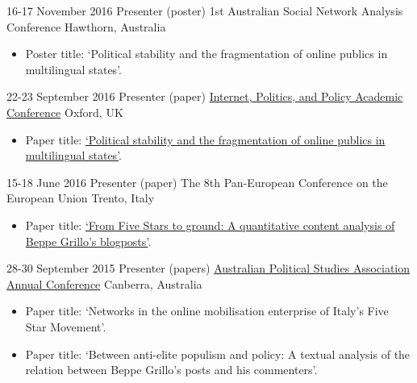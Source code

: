 \documentclass[11pt,a4paper,sans]{moderncv}
\begin{document}
    \cventry
      {16-17 November 2016} %
    {Presenter (poster)} %
    {1st Australian Social Network Analysis Conference} %
    {Hawthorn, Australia} %
  {}
    {
      \begin{itemize} %
        \item {Poster title: `Political stability and the fragmentation of online publics in multilingual states'.}
      \end{itemize}
    }

    \cventry
        {22-23 September 2016} %
    {Presenter (paper)} %
    {\href{http://ipp.oii.ox.ac.uk/2016}{Internet, Politics, and Policy Academic Conference}} %
    {Oxford, UK} %
{}
    {
      \begin{itemize} %
        \item {Paper title: \href{http://ipp.oii.ox.ac.uk/2016/programme-2016/track-a-politics/participation-ii-networks-and/francesco-bailo-political-stability-and}{`Political stability and the fragmentation of online publics in multilingual states'}.}
      \end{itemize}
    }


    \cventry
        {15-18 June 2016} %
    {Presenter (paper)} %
    {The 8th Pan-European Conference on the European Union} %
    {Trento, Italy} %
{}
    {
      \begin{itemize} %
        \item {Paper title:  \href{http://ecpr.eu/Events/PaperDetails.aspx?PaperID=27234&amp;EventID=105}{`From Five Stars to ground: A quantitative content analysis of Beppe Grillo's blogposts'}.}
      \end{itemize}
    }

    \cventry
        {28-30 September 2015} %
    {Presenter (papers)} %
    {\href{http://www.auspsa.org.au/page/apsa-conference-2015-0}{Australian Political Studies Association Annual Conference}} %
    {Canberra, Australia} %
{}
    {
      \begin{itemize} %
        \item {Paper title: `Networks in the online mobilisation enterprise of Italy's Five Star Movement'.}
        \item {Paper title: `Between anti-elite populism and policy: A textual analysis of the relation between Beppe Grillo's posts and his commenters'.}
      \end{itemize}
    }
\end{document}
